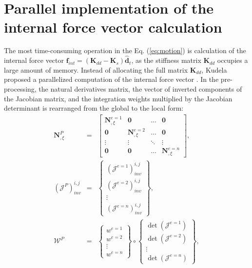\section{Parallel implementation of the internal force vector calculation}
\label{sec:gpu}


The most time-consuming operation in the Eq. (\ref{eq:motion}) is calculation of the internal force vector \(\textbf{f}_{int}=\left(\textbf{K}_{dd}-\textbf{K}_{s}\right)\widehat{\textbf{d}}_{t}\), as the stiffness matrix \(\textbf{K}_{dd}\) occupies a large amount of memory.
%
Instead of allocating the full matrix \(\textbf{K}_{dd}\), Kudela proposed a parallelized computation of the internal force vector \cite{kudela2016parallel}.
In the pre-processing, the natural derivatives matrix, the vector of inverted components of the Jacobian matrix, and the integration weights multiplied by the Jacobian determinant is rearranged from the global to the local form:
\begin{eqnarray}
	\label{eq:isoparametric}
	\textbf{N}^P_{,\xi} & = & \left[ \begin{array}{cccc}
		\textbf{N}^{e=1}_{,\xi} & \textbf{0} & \ldots & \textbf{0}\\
		\textbf{0} & \textbf{N}^{e=2}_{,\xi} & \ldots & \textbf{0}\\
		\vdots & \vdots &  \ddots & \vdots\\
		\textbf{0} & \textbf{0} & \ldots & \textbf{N}^{e=n}_{,\xi}
	\end{array}\right],\\
	\label{eq:jacob}
	\left(\mathcal{J}^P\right)^{i,j}_{inv} & = & \left\{ \begin{array}{c}
		\left(\mathcal{J}^{e=1}\right)^{i,j}_{inv}\\
		\left(\mathcal{J}^{e=2}\right)^{i,j}_{inv}\\
		\vdots\\
		\left(\mathcal{J}^{e=n}\right)^{i,j}_{inv} \end{array}\right\},\\
	\label{eq:intWeights}
	\mathcal{W}^P & = & \left\{ \begin{array}{c}
		w^{e=1}\\
		w^{e=2}\\
		\vdots\\
		w^{e=n} \end{array}\right\} \circ
	\left\{ \begin{array}{c}
		\det\left(\mathcal{J}^{e=1}\right)\\
		\det\left(\mathcal{J}^{e=2}\right)\\
		\vdots\\
		\det\left(\mathcal{J}^{e=n}\right)
	 \end{array}\right\},
\end{eqnarray}

